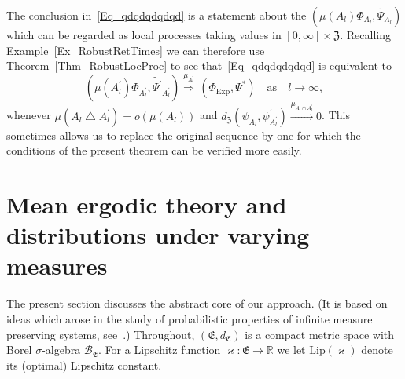 \documentclass[AHL,Unicode,longabstracts]{cedram}
\newcommand{\clB}{\mathcal{B}}
\newcommand{\Expl}{\mathrm{Exp}}
\newcommand{\Lip}{\mathrm{Lip}}
\newcommand{\frkE}{\mathfrak{E}}
\newcommand{\frkZ}{\mathfrak{Z}}
\newcommand{\bbR}{\mathbb{R}}
\begin{document}
\begin{rema}\label{R_RobustJoints}
The conclusion in~\eqref{Eq_qdqdqdqdqd} is a statement about the $(\mu(A_{l})\Phi_{A_{l}},\widetilde{\Psi}_{A_{l}})$ which can be regarded as local processes taking values in $[0,\infty]\times\frkZ$. Recalling Example~\ref{Ex_RobustRetTimes} we can therefore use Theorem~\ref{Thm_RobustLocProc} to see that~\eqref{Eq_qdqdqdqdqd} is equivalent to
\[
\left(\mu\left(A_{l}^{\prime}\right)\Phi_{A_{l}^{\prime}},\widetilde{\Psi^{\prime}} _{A_{l}^{\prime}}\right)\overset{\mu_{A_{l}^{\prime}}}{\Longrightarrow}
\,\left(\Phi_{\Expl},\Psi^{\ast}\right)\quad\text{as}\quad l\rightarrow\infty,
\]
whenever $\mu(A_{l}\bigtriangleup A_{l}^{\prime})=o(\mu(A_{l}))$ and $d_{\frkZ}(\psi_{A_{l}},\psi_{A_{l}^{\prime}}^{\prime})\overset {\mu_{A_{l}\cap A_{l}^{\prime}}}{\longrightarrow}0$. This sometimes allows us to replace the original sequence by one for which the conditions of the present theorem can be verified more easily.
\end{rema}




\section{Mean ergodic theory and distributions under varying measures}

The present section discusses the abstract core of our approach. (It is based on ideas which arose in the study of probabilistic properties of infinite measure preserving systems, see~\cite{PSZ,RZ,ZcompactRegeneration}.) Throughout, $(\frkE,d_{\frkE})$ is a compact metric space with Borel $\sigma$-algebra $\clB_{\frkE}$. For a Lipschitz function $\varkappa:\frkE\rightarrow\bbR$ we let $\Lip(\varkappa)$ denote its (optimal) Lipschitz constant.
\end{document}
